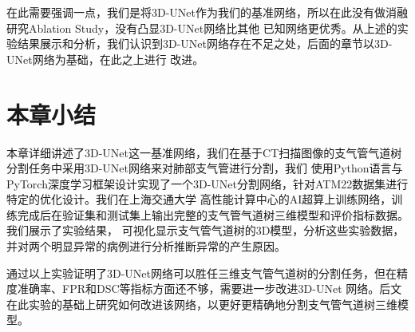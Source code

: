 在此需要强调一点，我们是将3D-UNet作为我们的基准网络，所以在此没有做消融研究Ablation Study，没有凸显3D-UNet网络比其他
已知网络更优秀。从上述的实验结果展示和分析，我们认识到3D-UNet网络存在不足之处，后面的章节以3D-UNet网络为基础，在此之上进行
改进。

\section{本章小结}

本章详细讲述了3D-UNet这一基准网络，我们在基于CT扫描图像的支气管气道树分割任务中采用3D-UNet网络来对肺部支气管进行分割，我们
使用Python语言与PyTorch深度学习框架设计实现了一个3D-UNet分割网络，针对ATM22数据集进行特定的优化设计。我们在上海交通大学
高性能计算中心的AI超算上训练网络，训练完成后在验证集和测试集上输出完整的支气管气道树三维模型和评价指标数据。我们展示了实验结果，
可视化显示支气管气道树的3D模型，分析这些实验数据，并对两个明显异常的病例进行分析推断异常的产生原因。

通过以上实验证明了3D-UNet网络可以胜任三维支气管气道树的分割任务，但在精度准确率、FPR和DSC等指标方面还不够，需要进一步改进3D-UNet
网络。后文在此实验的基础上研究如何改进该网络，以更好更精确地分割支气管气道树三维模型。
